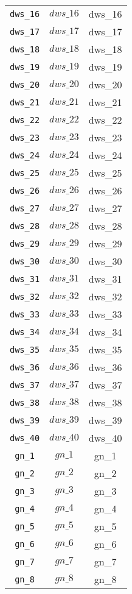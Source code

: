 \begin{center}
\begin{longtable}{ccc}
\texttt{dws\_16} & $dws\_16$ & dws\_16\\
\texttt{dws\_17} & $dws\_17$ & dws\_17\\
\texttt{dws\_18} & $dws\_18$ & dws\_18\\
\texttt{dws\_19} & $dws\_19$ & dws\_19\\
\texttt{dws\_20} & $dws\_20$ & dws\_20\\
\texttt{dws\_21} & $dws\_21$ & dws\_21\\
\texttt{dws\_22} & $dws\_22$ & dws\_22\\
\texttt{dws\_23} & $dws\_23$ & dws\_23\\
\texttt{dws\_24} & $dws\_24$ & dws\_24\\
\texttt{dws\_25} & $dws\_25$ & dws\_25\\
\texttt{dws\_26} & $dws\_26$ & dws\_26\\
\texttt{dws\_27} & $dws\_27$ & dws\_27\\
\texttt{dws\_28} & $dws\_28$ & dws\_28\\
\texttt{dws\_29} & $dws\_29$ & dws\_29\\
\texttt{dws\_30} & $dws\_30$ & dws\_30\\
\texttt{dws\_31} & $dws\_31$ & dws\_31\\
\texttt{dws\_32} & $dws\_32$ & dws\_32\\
\texttt{dws\_33} & $dws\_33$ & dws\_33\\
\texttt{dws\_34} & $dws\_34$ & dws\_34\\
\texttt{dws\_35} & $dws\_35$ & dws\_35\\
\texttt{dws\_36} & $dws\_36$ & dws\_36\\
\texttt{dws\_37} & $dws\_37$ & dws\_37\\
\texttt{dws\_38} & $dws\_38$ & dws\_38\\
\texttt{dws\_39} & $dws\_39$ & dws\_39\\
\texttt{dws\_40} & $dws\_40$ & dws\_40\\
\texttt{gn\_1} & $gn\_1$ & gn\_1\\
\texttt{gn\_2} & $gn\_2$ & gn\_2\\
\texttt{gn\_3} & $gn\_3$ & gn\_3\\
\texttt{gn\_4} & $gn\_4$ & gn\_4\\
\texttt{gn\_5} & $gn\_5$ & gn\_5\\
\texttt{gn\_6} & $gn\_6$ & gn\_6\\
\texttt{gn\_7} & $gn\_7$ & gn\_7\\
\texttt{gn\_8} & $gn\_8$ & gn\_8\\

\end{longtable}
\end{center}
